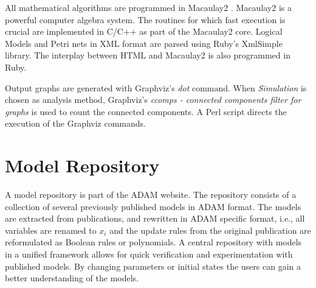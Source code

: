 \documentclass[11pt]{amsart}
\begin{document}
All mathematical algorithms are programmed in Macaulay2 \cite{M2}. Macaulay2 is a powerful computer algebra system. The routines for which fast execution is crucial are implemented in C/C++ as part of the Macaulay2 core. Logical Models and Petri nets in XML format are parsed using Ruby's XmlSimple library. The interplay between HTML and Macaulay2 is also programmed in Ruby.

Output graphs are generated with Graphviz's {\it dot} command. When {\it Simulation} is chosen as analysis method, Graphviz's {\it ccomps - connected components filter for graphs} is used to count the connected components. A Perl script directs the execution of the Graphviz commands.
\section{Model Repository}

A model repository is part of the ADAM website. The repository consists of a collection of several previously published models in ADAM format. The models are extracted from publications, and rewritten in ADAM specific format, i.e., all variables are renamed to $x_i$ and the update rules from the original publication are reformulated as Boolean rules or polynomials. A central repository with models in a unified framework allows for quick verification and experimentation with published models. By changing parameters or initial states the users can gain a better understanding of the models.
\end{document}

